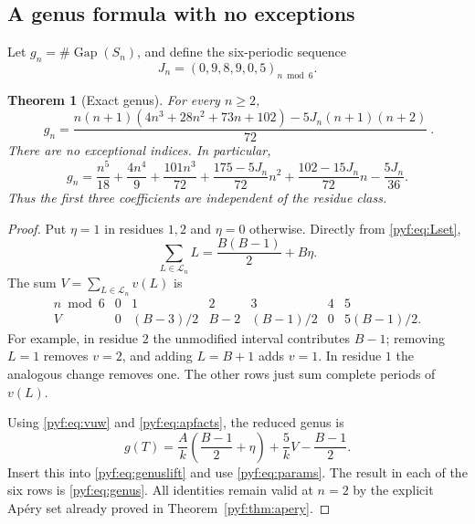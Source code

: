\documentclass[11pt,a4paper]{article}
\numberwithin{equation}{section}
\newtheorem{theorem}{Theorem}[section]
\theoremstyle{definition}
\newcommand{\Gap}{\operatorname{Gap}}
\begin{document}
\subsection{A genus formula with no exceptions}

Let $g_n=\#\Gap(S_n)$, and define the six-periodic sequence
\begin{equation}\label{pyf:eq:J}
J_n=(0,9,8,9,0,5)_{n\bmod6}.
\end{equation}

\begin{theorem}[Exact genus]\label{pyf:thm:genus}
For every $n\geq2$,
\begin{equation}\label{pyf:eq:genus}
\boxed{\
g_n=\frac{n(n+1)(4n^3+28n^2+73n+102)
             -5J_n(n+1)(n+2)}{72}\ }.
\end{equation}
There are no exceptional indices. In particular,
\begin{equation}\label{pyf:eq:genusexp}
g_n=\frac{n^5}{18}+\frac{4n^4}{9}+\frac{101n^3}{72}
+\frac{175-5J_n}{72}n^2+\frac{102-15J_n}{72}n-\frac{5J_n}{36}.
\end{equation}
Thus the first three coefficients are independent of the residue class.
\end{theorem}

\begin{proof}
Put $\eta=1$ in residues $1,2$ and $\eta=0$ otherwise. Directly from
\eqref{pyf:eq:Lset},
\[
\sum_{L\in\mathcal L_n}L=\frac{B(B-1)}2+B\eta.
\]
The sum $V=\sum_{L\in\mathcal L_n}v(L)$ is
\begin{equation}\label{pyf:eq:V}
\begin{array}{c|rrrrrr}
n\bmod6&0&1&2&3&4&5\\ \hline
V&0&(B-3)/2&B-2&(B-1)/2&0&5(B-1)/2.
\end{array}
\end{equation}
For example, in residue $2$ the unmodified interval contributes $B-1$;
removing $L=1$ removes $v=2$, and adding $L=B+1$ adds $v=1$.
In residue $1$ the analogous change removes one. The other rows just sum
complete periods of $v(L)$.

Using \eqref{pyf:eq:vuw} and \eqref{pyf:eq:apfacts}, the reduced genus is
\begin{equation}\label{pyf:eq:redgenus}
g(T)=\frac Ak\left(\frac{B-1}{2}+\eta\right)
       +\frac5k V-\frac{B-1}{2}.
\end{equation}
Insert this into \eqref{pyf:eq:genuslift} and use
\eqref{pyf:eq:params}. The result in each of the six rows is
\eqref{pyf:eq:genus}. All identities remain valid at $n=2$ by the explicit
Ap\'ery set already proved in Theorem~\ref{pyf:thm:apery}.
\end{proof}
\end{document}
